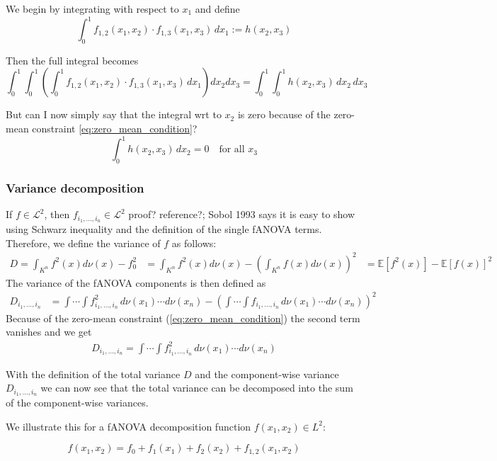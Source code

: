 We begin by integrating with respect to \( x_1 \) and define
\[
\int_0^1 f_{1,2}(x_1, x_2) \cdot f_{1,3}(x_1, x_3) \, dx_1 := h(x_2, x_3)
\]

Then the full integral becomes
\[
\int_0^1 \int_0^1 \left( \int_0^1 f_{1,2}(x_1, x_2) \cdot f_{1,3}(x_1, x_3) \, dx_1 \right) dx_2 dx_3 = \int_0^1 \int_0^1 h(x_2, x_3) \, dx_2 \, dx_3
\]

But can I now simply say that the integral wrt to $x_2$ is zero because of the zero-mean constraint \autoref{eq:zero_mean_condition}?
\[
\int_0^1 h(x_2, x_3) \, dx_2 = 0 \quad \text{for all } x_3
\]


\subsubsection*{Variance decomposition}
If $f \in \mathcal{L}^2$, then $f_{i_{1}, \dots, i_{n}} \in \mathcal{L}^2$ {\color{blue}proof? reference?; Sobol 1993 says it is easy to show using Schwarz inequality and the definition of the single fANOVA terms.}
Therefore, we define the variance of $f$ as follows:
\begin{align*}
    D = \int_{K^n} f^2(x)d\nu (x) - f^2_{0} &= \int_{K^n} f^2(x)d\nu (x) - (\int_{K^n} f(x)d\nu (x))^2 &= \mathbb{E}[f^2(x)] - \mathbb{E}[f(x)]^2
    \label{variance_whole}
\end{align*}
The variance of the fANOVA components is then defined as
\begin{align*}
    D_{i_{1}, \dots, i_{n}} 
    &= \int \cdots \int f^2_{i_{1}, \dots, i_{n}} \, d\nu(x_1) \cdots d\nu(x_n) - \left( \int \cdots \int f_{i_{1}, \dots, i_{n}} \, d\nu(x_1) \cdots d\nu(x_n) \right)^2
\end{align*}
Because of the zero-mean constraint (\autoref{eq:zero_mean_condition}) the second term vanishes and we get
\begin{align*}
    D_{i_{1}, \dots, i_{n}} = \int \cdots \int f^2_{i_{1}, \dots, i_{n}} \, d\nu(x_1) \cdots d\nu(x_n)
\end{align*}

With the definition of the total variance $D$ and the component-wise variance $D_{i_{1}, \dots, i_{n}}$ we can now see that the total variance can be decomposed into the sum of the component-wise variances.

We illustrate this for a fANOVA decomposition function \( f(x_1, x_2) \in L^2 \):

\[
f(x_1, x_2) = f_0 + f_1(x_1) + f_2(x_2) + f_{1,2}(x_1, x_2)
\]

